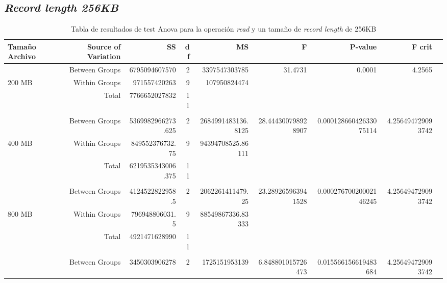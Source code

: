 \begin{landscape}
\subsection{\textit{Record length 256KB}}
\begin{table}[!htp]\centering
\caption{Tabla de resultados de test Anova para la operación \textit{read} y un tamaño de \textit{record length} de 256KB}\label{tab: }
\scriptsize
\begin{tabular}{lrrrrrrrr}\toprule
Tamaño Archivo &Source of Variation &SS &df &MS &F &P-value &F crit \\\midrule
&Between Groups &6795094607570 &2 &3397547303785 &31.4731 &0.0001 &4.2565 \\
200 MB &Within Groups &971557420263 &9 &107950824474 & & & \\
&Total &7766652027832 &11 & & & & \\
& & & & & & & \\
&Between Groups &5369982966273.625 &2 &2684991483136.8125 &28.444300798928907 &0.00012866042633075114 &4.256494729093742 \\
400 MB &Within Groups &849552376732.75 &9 &94394708525.86111 & & & \\
&Total &6219535343006.375 &11 & & & & \\
& & & & & & & \\
&Between Groups &4124522822958.5 &2 &2062261411479.25 &23.289265963941528 &0.00027670020002146245 &4.256494729093742 \\
800 MB &Within Groups &796948806031.5 &9 &88549867336.83333 & & & \\
&Total &4921471628990 &11 & & & & \\
& & & & & & & \\
&Between Groups &3450303906278 &2 &1725151953139 &6.848801015726473 &0.015566156619483684 &4.256494729093742 \\

\end{tabular}
\end{table}
\end{landscape}
